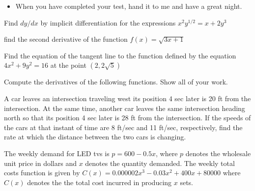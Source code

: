 \documentclass[12pt,letterpaper]{exam}
\begin{document}
\begin{itemize}

\item When you have completed your test, hand it to me and have a great night.


\end{itemize}

\newpage

\begin{questions}
\addpoints
\question[5] Find $dy/dx$ by implicit differentiation for the  expressions $x^2y^{1/2} = x+2y^3$
  \vfill

\question[8] find the second derivative of the function $\displaystyle f(x) = \sqrt{3x+1}$ 
  \vfill
  
\question[7] Find the equation of the tangent line to the function defined by the equation $4x^2 + 9y^2 = 16$ at the point $(2,2\sqrt{5})$
\vfill

\newpage
\addpoints

\question Compute the derivatives of the following functions.  Show all of your work.


\newpage 
\addpoints

\question[10] A car leaves an intersection traveling west its position 4 sec later is 20 ft from the intersection.  At the same time, another car leaves the same intersection heading north so that its position 4 sec later is 28 ft from the intersection.  If the speeds of the cars at that instant of time are 8 ft/sec and 11 ft/sec, respectively, find the rate at which the distance between the two cars is changing.
\vfill

\newpage
\addpoints
\question The weekly demand for LED tvs is $p = 600-0.5x$, where $p$ denotes the wholesale unit price in dollars and $x$ denotes the quantity demanded.  The weekly total costs function is given by $C(x) = 0.000002x^3 - 0.03x^2 + 400x + 80000$ where $C(x)$ denotes the the total cost incurred in producing $x$ sets.
\end{questions}
\end{document}
